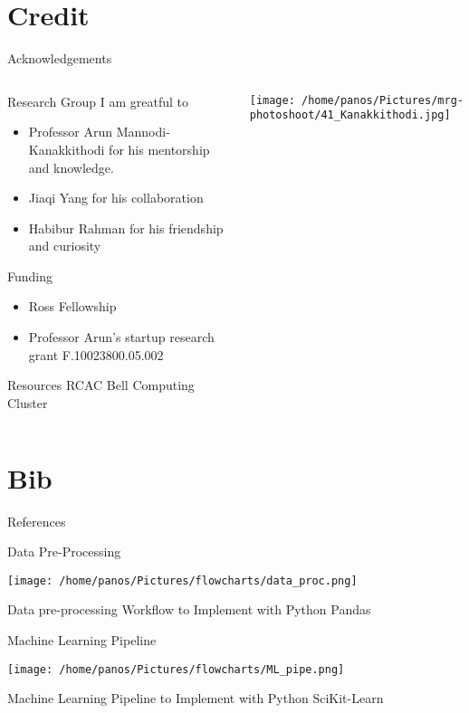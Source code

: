 \documentclass[10pt, aspectratio=169, presentation]{beamer}
\begin{document}
\section{Credit}
\label{sec:org9e7c9be}
\begin{frame}[label={sec:orgb2fdb98}]{Acknowledgements}
\begin{columns}
\begin{column}{0.6\columnwidth}
\begin{block}{Research Group}
I am greatful to
\begin{itemize}
\item Professor Arun Mannodi-Kanakkithodi for his mentorship and knowledge.
\item Jiaqi Yang for his collaboration
\item Habibur Rahman for his friendship and curiosity
\end{itemize}
\end{block}
\begin{block}{Funding}
\begin{itemize}
\item Ross Fellowship
\item Professor Arun's startup research grant F.10023800.05.002
\end{itemize}
\end{block}
\begin{block}{Resources}
RCAC Bell Computing Cluster
\end{block}
\end{column}
\begin{column}{0.4\columnwidth}
\hspace*{-20cm}
\begin{center}
\texttt{[image: /home/panos/Pictures/mrg-photoshoot/41\_Kanakkithodi.jpg]}
\end{center}
\end{column}
\end{columns}
\end{frame}
\section{Bib}
\label{sec:org5b56996}
\begin{frame}[allowframebreaks]{References}
\AtNextBibliography{\tiny}
\printbibliography
\end{frame}
\appendix
\begin{frame}[label={sec:orgec90664}]{Data Pre-Processing}
\begin{center}
\texttt{[image: /home/panos/Pictures/flowcharts/data\_proc.png]}
\end{center}
Data pre-processing Workflow to Implement with Python Pandas
\end{frame}
\begin{frame}[label={sec:org58215ef}]{Machine Learning Pipeline}
\begin{center}
\texttt{[image: /home/panos/Pictures/flowcharts/ML\_pipe.png]}
\end{center}
Machine Learning Pipeline to Implement with Python SciKit-Learn
\end{frame}
\end{document}
